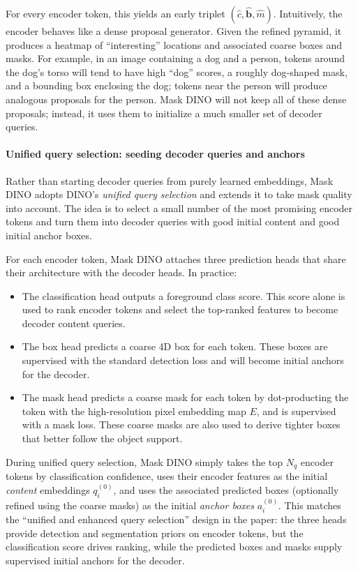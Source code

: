 \begin{enrichment}
\begin{enrichment}
		For every encoder token, this yields an early triplet $(\hat c,\hat{\mathbf{b}},\hat m)$.
		Intuitively, the encoder behaves like a dense proposal generator.
		Given the refined pyramid, it produces a heatmap of ``interesting'' locations and associated coarse boxes and masks.
		For example, in an image containing a dog and a person, tokens around the dog’s torso will tend to have high ``dog'' scores, a roughly dog-shaped mask, and a bounding box enclosing the dog; tokens near the person will produce analogous proposals for the person.
		Mask DINO will not keep all of these dense proposals; instead, it uses them to initialize a much smaller set of decoder queries.
		
		\paragraph{Unified query selection: seeding decoder queries and anchors}
		
		Rather than starting decoder queries from purely learned embeddings, Mask DINO adopts DINO’s \emph{unified query selection} and extends it to take mask quality into account.
		The idea is to select a small number of the most promising encoder tokens and turn them into decoder queries with good initial content and good initial anchor boxes.
		
		For each encoder token, Mask DINO attaches three prediction heads that share their architecture with the decoder heads. In practice:
		
		\begin{itemize}
			\item The classification head outputs a foreground class score. This score alone is used to rank encoder tokens and select the top-ranked features to become decoder content queries.
			\item The box head predicts a coarse 4D box for each token. These boxes are supervised with the standard detection loss and will become initial anchors for the decoder.
			\item The mask head predicts a coarse mask for each token by dot-producting the token with the high-resolution pixel embedding map $E$, and is supervised with a mask loss. These coarse masks are also used to derive tighter boxes that better follow the object support.
		\end{itemize}
		
		During unified query selection, Mask DINO simply takes the top $N_q$ encoder tokens by classification confidence, uses their encoder features as the initial \emph{content} embeddings $q_i^{(0)}$, and uses the associated predicted boxes (optionally refined using the coarse masks) as the initial \emph{anchor boxes} $a_i^{(0)}$. This matches the ``unified and enhanced query selection'' design in the paper: the three heads provide detection and segmentation priors on encoder tokens, but the classification score drives ranking, while the predicted boxes and masks supply supervised initial anchors for the decoder.
		

\end{enrichment}
\end{enrichment}
